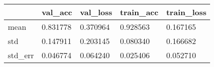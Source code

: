 \begin{tabular}{|l|l|l|l|l|}
\toprule \hline
 & val\_acc & val\_loss & train\_acc & train\_loss \\ \hline
\midrule
mean & 0.831778 & 0.370964 & 0.928563 & 0.167165 \\ \hline
std & 0.147911 & 0.203145 & 0.080340 & 0.166682 \\ \hline
std\_err & 0.046774 & 0.064240 & 0.025406 & 0.052710 \\ \hline
\bottomrule
\end{tabular}
